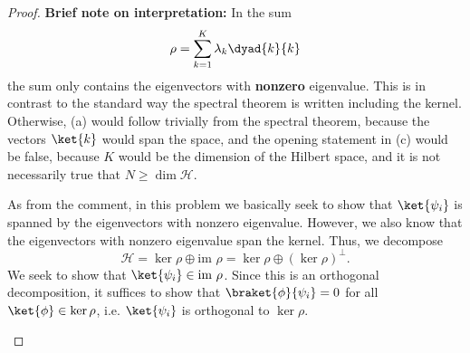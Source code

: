 \begin{proof}
	\textbf{Brief note on interpretation:} In the sum
	\[
		\rho = \sum_{k=1}^K \lambda_k \dyad{k}{k}
	\]
	the sum only contains the eigenvectors with \textbf{nonzero} eigenvalue. This is in contrast to the standard way the spectral theorem is written including the kernel. Otherwise, (a) would follow trivially from the spectral theorem, because the vectors $\ket{k}$ would span the space, and the opening statement in (c) would be false, because $K$ would be the dimension of the Hilbert space, and it is not necessarily true that $N\ge \dim \mathcal{H}$.
	\begin{parts}
	\item As from the comment, in this problem we basically seek to show that $\ket{\psi_i}$ is spanned by the eigenvectors with nonzero eigenvalue. However, we also know that the eigenvectors with nonzero eigenvalue span the kernel. Thus, we decompose
		\[
			\mathcal{H }= \ker \rho \oplus \text{im } \rho = \ker\rho \oplus (\ker\rho)^\perp
		.\] 
		We seek to show that $\ket{\psi_i} \in \text{im }\rho$. Since this is an orthogonal decomposition, it suffices to show that $\braket{\phi}{\psi_i}=0$ for all $\ket{\phi}\in \ker \rho$, i.e. $\ket{\psi_i}$ is orthogonal to $\ker\rho$.


\end{parts}
\end{proof}
